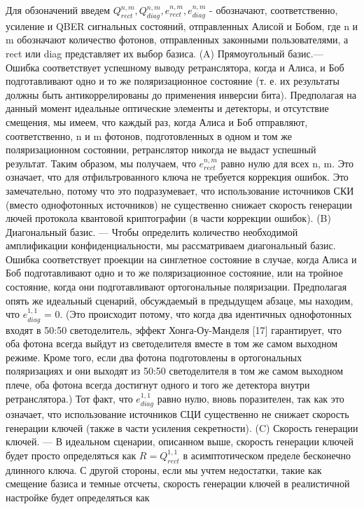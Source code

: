 \newline Для обзоначений введем $Q_{rect}^{n,m} , Q_{diag}^{n,m} , e_{rect}^{n,m} , e_{diag}^{n,m}$ - обозначают, соответственно, усиление и QBER сигнальных состояний, отправленных Алисой и Бобом, где n и m обозначают количество фотонов, отправленных законными пользователями, а rect или diag представляет их выбор базиса.
\newline (A) Прямоугольный базис.— Ошибка соответствует успешному выводу ретранслятора, когда и Алиса, и Боб подготавливают одно и то же поляризационное состояние (т. е. их результаты должны быть антикоррелированы до применения инверсии бита). Предполагая на данный момент идеальные оптические элементы и детекторы, и отсутствие смещения, мы имеем, что каждый раз, когда Алиса и Боб отправляют, соответственно, n и m фотонов, подготовленных в одном и том же поляризационном состоянии, ретранслятор никогда не выдаст успешный результат. Таким образом, мы получаем, что $e_{rect}^{n,m}$
 равно нулю для всех n, m. Это означает, что для отфильтрованного ключа не требуется коррекция ошибок. Это замечательно, потому что это подразумевает, что использование источников СКИ (вместо однофотонных источников) не существенно снижает скорость генерации лючей протокола квантовой криптографии (в части коррекции ошибок).
\newline (B) Диагональный базис. — Чтобы определить количество необходимой амплификации конфиденциальности, мы рассматриваем диагональный базис. Ошибка соответствует проекции на синглетное состояние в случае, когда Алиса и Боб подготавливают одно и то же поляризационное состояние, или на тройное состояние, когда они подготавливают ортогональные поляризации. Предполагая опять же идеальный сценарий, обсуждаемый в предыдущем абзаце, мы находим, что $e_{diag}^{1,1}$ = 0. (Это происходит потому, что когда два идентичных однофотонных входят в 50:50 светоделитель, эффект Хонга-Оу-Манделя [17] гарантирует, что оба фотона всегда выйдут из светоделителя вместе в том же самом выходном режиме. Кроме того, если два фотона подготовлены в ортогональных поляризациях и они выходят из 50:50 светоделителя в том же самом выходном плече, оба фотона всегда достигнут одного и того же детектора внутри ретранслятора.) Тот факт, что $e_{diag}^{1,1}$ равно нулю, вновь поразителен, так как это означает, что использование источников СЦИ существенно не снижает скорость генерации ключей (также в части усиления секретности).
\newline (C) Скорость генерации ключей. — В идеальном сценарии, описанном выше, скорость генерации ключей будет просто определяться как $R = Q_{rect}^{1,1}$ в асимптотическом пределе бесконечно длинного ключа. С другой стороны, если мы учтем недостатки, такие как смещение базиса и темные отсчеты, скорость генерации ключей в реалистичной настройке будет определяться как
